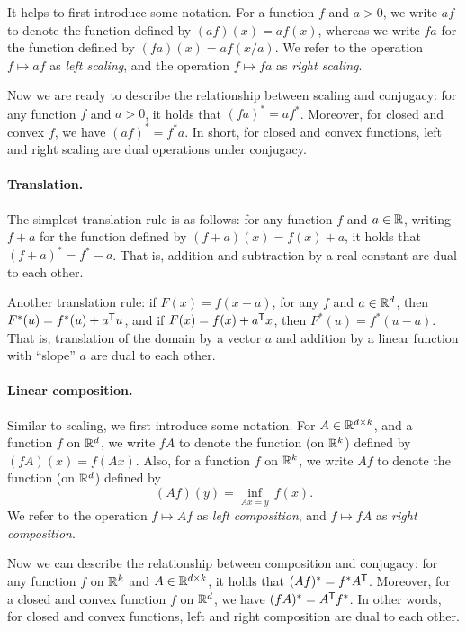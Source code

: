 It helps to first introduce some notation. For a function $f$ and $a>0$, we
write $af$ to denote the function defined by $(af)(x) = af(x)$, whereas we write
$fa$ for the function defined by $(fa)(x) = af(x/a)$. We refer to the operation
$f \mapsto af$ as \emph{left scaling}, and the operation $f \mapsto fa$ as
\emph{right scaling}.

Now we are ready to describe the relationship between scaling and conjugacy: for
any function $f$ and $a>0$, it holds that $(fa)^* = af^*$. Moreover, for closed 
and convex $f$, we have $(af)^* = f^*a$. In short, for closed and convex
functions, left and right scaling are dual operations under conjugacy. 

\paragraph{Translation.}

The simplest translation rule is as follows: for any function $f$ and $a \in
\mathbb{R}$, writing $f+a$ for the function defined by $(f+a)(x) = f(x)+a$, it holds
that $(f+a)^* = f^*-a$. That is, addition and subtraction by a real constant are
dual to each other.

Another translation rule: if $F(x) = f(x-a)$, for any $f$ and $a \in \mathbb{R}^d$, then
$F^*(u) = f^*(u) + a^{\mathsf{T}} u$, and if $F(x) = f(x) + a^{\mathsf{T}} x$, then $F^*(u) =
f^*(u-a)$. That is, translation of the domain by a vector $a$ and addition by a
linear function with ``slope'' $a$ are dual to each other. 

\paragraph{Linear composition.}

Similar to scaling, we first introduce some notation. For $A \in \mathbb{R}^{d \times
  k}$, and a function $f$ on $\mathbb{R}^d$, we write $fA$ to denote the function (on
$\mathbb{R}^k$) defined by $(fA)(x) = f(Ax)$. Also, for a function $f$ on $\mathbb{R}^k$, we
write $Af$ to denote the function (on $\mathbb{R}^d$) defined by 
\[
(Af)(y) = \inf_{Ax=y} \, f(x).
\]
We refer to the operation $f \mapsto Af$ as \emph{left composition}, and $f
\mapsto fA$ as \emph{right composition}.

Now we can describe the relationship between composition and conjugacy: for any
function $f$ on $\mathbb{R}^k$ and $A \in \mathbb{R}^{d \times k}$, it holds that $(Af)^* =
f^*A^{\mathsf{T}}$. Moreover, for a closed and convex function $f$ on $\mathbb{R}^d$, we have 
$(fA)^* = A^{\mathsf{T}} f^*$. In other words, for closed and convex functions, left and
right composition are dual to each other.     


